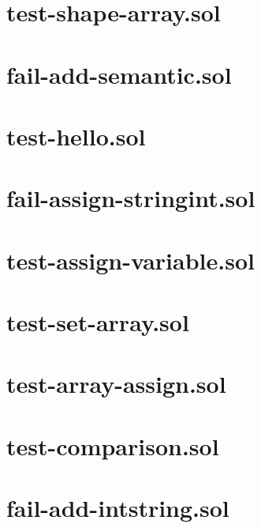 \section{test-shape-array.sol}


\section{fail-add-semantic.sol}


\section{test-hello.sol}


\section{fail-assign-stringint.sol}


\section{test-assign-variable.sol}


\section{test-set-array.sol}


\section{test-array-assign.sol}


\section{test-comparison.sol}


\section{fail-add-intstring.sol}


